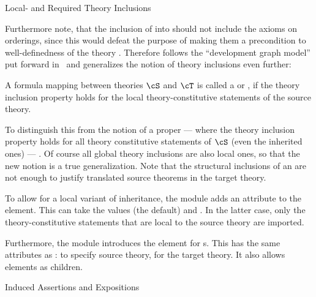 \begin{omgroup}[id=complex-theories,short=Complex Theories,
                            creators=miko,contributors=frabe]
\begin{omgroup}[id=restricting-inference,short=Local/Required Theory Inclusions]{Local- and
  Required Theory Inclusions}
\begin{module}[id=restinf]
Furthermore note, that the inclusion of {} into {}
should not include the {} axioms on orderings, since this would defeat the
purpose of making them a precondition to well-definedness of the theory
{}. Therefore {\omdoc} follows the ``development graph model'' put
forward in~\cite{Hutter:mocsv00} and generalizes the notion of theory inclusions even
further:
\begin{definition}[display=flow,id=local.theory.inclusion]
  A formula mapping between theories $\cS$ and $\cT$ is called a
  {} or {}, if the theory
  inclusion property holds for the local theory-constitutive statements of the source
  theory.
\end{definition}
To distinguish this from the notion of a proper {} --- where
the theory inclusion property holds for all theory constitutive statements of $\cS$ (even
the inherited ones) --- . Of course all
global theory inclusions are also local ones, so that the new notion is a true
generalization. Note that the structural inclusions of an {} are
not enough to justify translated source theorems in the target theory.

To allow for a local variant of inheritance, the {} module adds an
attribute {} to the {} element. This can take
the values {} (the default) and
{}. In the latter case, only the theory-constitutive
statements that are local to the source theory are imported.
  
\begin{definition}[id=axiom-inclusion.def]
  Furthermore, the {} module introduces the {}
  element for {s}. This has the same attributes as
  {}: {} to specify source
  theory, {} for the target theory. It also allows
  {} elements as children.
\end{definition}
\end{module}
\end{omgroup}


\begin{omgroup}[id=induced-assertions,short=Induced Assertions]{Induced Assertions and
  Expositions}
\begin{module}[id=assertionvia]


\end{module}
\end{omgroup}
\end{omgroup}
